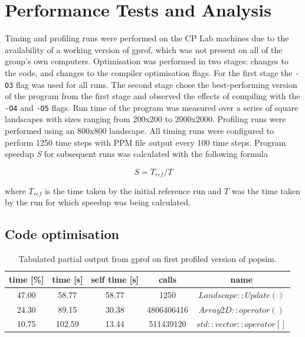 \section{Performance Tests and Analysis}
\label{Performance Tests and Analysis}

Timing and profiling runs were performed on the CP Lab machines due to the availability of a working version of gprof, which was not present on all of the group's own computers.
Optimisation was performed in two stages: changes to the code, and changes to the compiler optimisation flags.  For the first stage the \texttt{-O3} flag was used for all runs.  The second stage chose the best-performing version of the program from the first stage and observed the effects of compiling with the \texttt{-O4} and \texttt{-O5} flags.
Run time of the program was measured over a series of square landscapes with sizes ranging from 200x200 to 2000x2000.
Profiling runs were performed using an 800x800 landscape.
All timing runs were configured to perform 1250 time steps with PPM file output every 100 time steps.
Program speedup \textit{S} for subsequent runs was calculated with the following formula

\begin{equation} 
S = T_{ref} / T 
\label{equation:speedup}
\end{equation}

where $T_{ref}$ is the time taken by the initial reference run and ${T}$ was the time taken by the run for which speedup was being calculated.


\subsection{Code optimisation}
\label{Code optimisation}

\begin{table}[h!]
\caption{Tabulated partial output from gprof on first profiled version of popsim.}
\label{tab:profile1}
\begin{center}
\begin{tabular}{|c|c|c|c|c|}
\hline
time [\%] & time [s] & self time [s] & calls & name\\
\hline
47.00 & 58.77 & 58.77 & 1250 & $Landscape::Update()$\\
\hline
24.30 & 89.15 & 30.38& 4806406416 & $Array2D::operator()$\\
\hline
10.75& 102.59 & 13.44 & 511439120 & $std::vector::operator[]$\\
\hline
\end{tabular}
\end{center}
\end{table}

